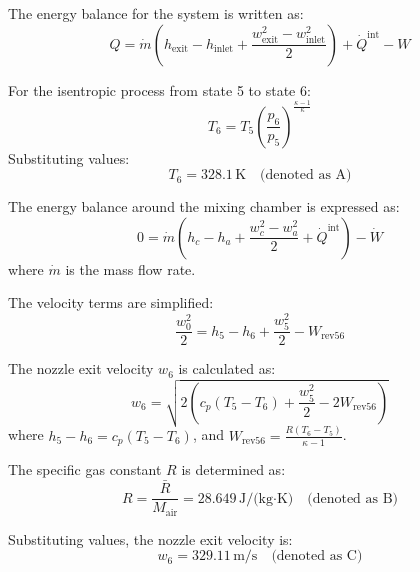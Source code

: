 The energy balance for the system is written as:  
\[
Q = \dot{m} \left( h_{\text{exit}} - h_{\text{inlet}} + \frac{w_{\text{exit}}^2 - w_{\text{inlet}}^2}{2} \right) + \dot{Q}^{\text{int}} - W
\]

For the isentropic process from state 5 to state 6:  
\[
T_6 = T_5 \left( \frac{p_6}{p_5} \right)^{\frac{\kappa - 1}{\kappa}}
\]  
Substituting values:  
\[
T_6 = 328.1 \, \text{K} \quad \text{(denoted as A)}
\]

The energy balance around the mixing chamber is expressed as:  
\[
0 = \dot{m} \left( h_c - h_a + \frac{w_c^2 - w_a^2}{2} + \dot{Q}^{\text{int}} \right) - \dot{W}
\]  
where \( \dot{m} \) is the mass flow rate.  

The velocity terms are simplified:  
\[
\frac{w_0^2}{2} = h_5 - h_6 + \frac{w_5^2}{2} - W_{\text{rev56}}
\]

The nozzle exit velocity \( w_6 \) is calculated as:  
\[
w_6 = \sqrt{2 \left( c_p (T_5 - T_6) + \frac{w_5^2}{2} - 2 W_{\text{rev56}} \right)}
\]  
where \( h_5 - h_6 = c_p (T_5 - T_6) \), and \( W_{\text{rev56}} = \frac{R (T_6 - T_5)}{\kappa - 1} \).  

The specific gas constant \( R \) is determined as:  
\[
R = \frac{\bar{R}}{M_{\text{air}}} = 28.649 \, \text{J/(kg·K)} \quad \text{(denoted as B)}
\]

Substituting values, the nozzle exit velocity is:  
\[
w_6 = 329.11 \, \text{m/s} \quad \text{(denoted as C)}
\]
